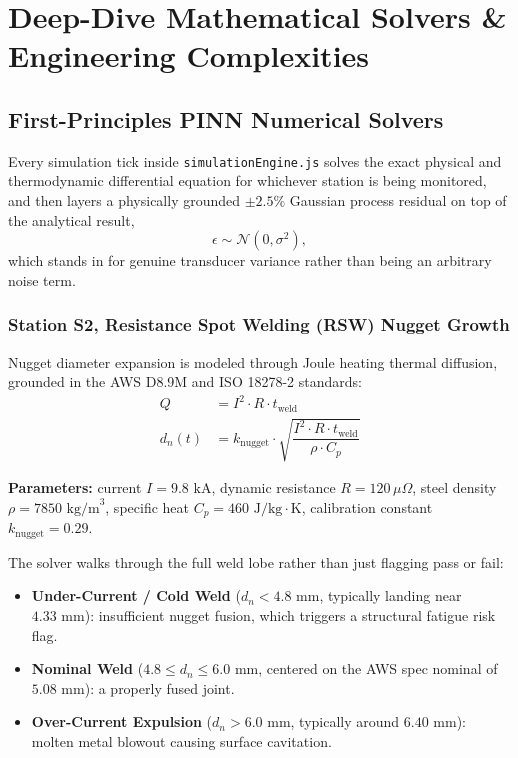 \documentclass[11pt]{article}
\begin{document}
\newpage
\section{Deep-Dive Mathematical Solvers \& Engineering Complexities}

\subsection{First-Principles PINN Numerical Solvers}

Every simulation tick inside \texttt{simulationEngine.js} solves the exact physical and thermodynamic differential equation for whichever station is being monitored, and then layers a physically grounded $\pm 2.5\%$ Gaussian process residual on top of the analytical result,
\[
\epsilon \sim \mathcal{N}(0, \sigma^2),
\]
which stands in for genuine transducer variance rather than being an arbitrary noise term.

\subsubsection{Station S2, Resistance Spot Welding (RSW) Nugget Growth}

Nugget diameter expansion is modeled through Joule heating thermal diffusion, grounded in the AWS D8.9M and ISO 18278-2 standards:
\begin{align}
Q &= I^2 \cdot R \cdot t_{\text{weld}} \\
d_n(t) &= k_{\text{nugget}} \cdot \sqrt{\dfrac{I^2 \cdot R \cdot t_{\text{weld}}}{\rho \cdot C_p}}
\end{align}

\textbf{Parameters:} current $I = 9.8\text{ kA}$, dynamic resistance $R = 120\,\mu\Omega$, steel density $\rho = 7850\text{ kg/m}^3$, specific heat $C_p = 460\text{ J/kg}\cdot\text{K}$, calibration constant $k_{\text{nugget}} = 0.29$.

The solver walks through the full weld lobe rather than just flagging pass or fail:
\begin{itemize}[leftmargin=1.2cm]
    \item \textbf{Under-Current / Cold Weld} ($d_n < 4.8\text{ mm}$, typically landing near $4.33\text{ mm}$): insufficient nugget fusion, which triggers a structural fatigue risk flag.
    \item \textbf{Nominal Weld} ($4.8 \le d_n \le 6.0\text{ mm}$, centered on the AWS spec nominal of $5.08\text{ mm}$): a properly fused joint.
    \item \textbf{Over-Current Expulsion} ($d_n > 6.0\text{ mm}$, typically around $6.40\text{ mm}$): molten metal blowout causing surface cavitation.
\end{itemize}
\end{document}
